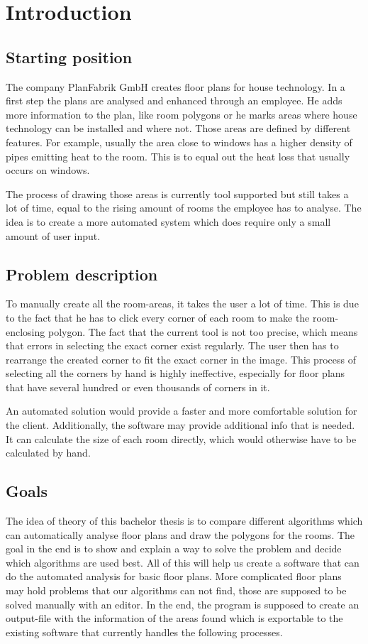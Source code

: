 \section{Introduction}
\subsection{Starting position}
The company PlanFabrik GmbH creates floor plans for house technology. In a first
step the plans are analysed and enhanced through an employee. He adds more
information to the plan, like room polygons or he marks areas where house technology
can be installed and where not. Those areas are defined by different features. For example, usually the area close to windows has a higher density of pipes emitting heat to the room. This is to equal out the heat loss that usually occurs on windows.

The process of drawing those areas is currently tool supported but still takes a lot of time, equal to the rising amount of rooms the employee has to analyse. The idea is to create a more automated system which does require only a small amount of user input.

\subsection{Problem description}
To manually create all the room-areas, it takes the user a lot of time. This is due to the fact that he has to click every corner of each room to make the room-enclosing polygon. The fact that the current tool is not too precise, which means that errors in selecting the exact corner exist regularly. The user then has to rearrange the created corner to fit the exact corner in the image. This process of selecting all the corners by hand is highly ineffective, especially for floor plans that have several hundred or even thousands of corners in it.

An automated solution would provide a faster and more comfortable solution for the client. Additionally, the software may provide additional info that is needed. It can calculate the size of each room directly, which would otherwise have to be calculated by hand.

\subsection{Goals}
The idea of theory of this bachelor thesis is to compare different algorithms which can automatically analyse floor plans and draw the polygons for the rooms. The goal in the end is to show and explain a way to solve the problem and decide which algorithms are used best. All of this will help us create a software that can do the automated analysis for basic floor plans. More complicated floor plans may hold problems that our algorithms can not find, those are supposed to be solved manually with an editor.
In the end, the program is supposed to create an output-file with the information of the areas found which is exportable to the existing software that currently handles the following processes. 